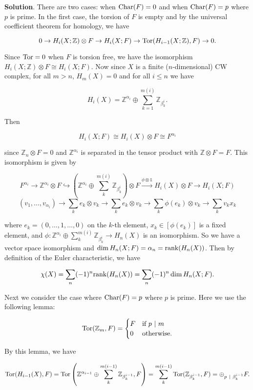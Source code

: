 \documentclass{article}
\newcommand{\Z}{\mathbb{Z}}
\newcommand{\identity}{\mathds{1}}
\newcommand{\Tor}{\textnormal{Tor}}
\newcommand{\Char}{\textnormal{Char}}
\begin{document}
\textbf{Solution}. There are two cases: when $\Char(F) = 0$ and when $\Char(F) = p$ where $p$ is prime. In the first case, the torsion of $F$ is empty and by the universal coefficient theorem for homology, we have

$$0\to H_{i}(X; \Z)\otimes F\to H_{i}(X; F)\to \Tor(H_{i-1}(X; \Z), F)\to 0.$$

Since $\Tor = 0$ when $F$ is torsion free, we have the isomorphism $H_{i}(X; \Z)\otimes F\cong H_{i}(X; F)$. Now since $X$ is a finite ($n$-dimensional) CW complex, for all $m > n$, $H_{m}(X) = 0$ and for all $i\leq n$ we have

$$H_{i}(X) = \Z^{\alpha_{i}}\oplus \sum_{k=1}^{m(i)} \Z_{\beta_{k}^{i}}.$$

Then

$$H_{i}(X; F)\cong H_{i}(X)\otimes F\cong F^{\alpha_{i}}$$

since $\Z_{n}\otimes F = 0$ and $\Z^{\alpha_{i}}$ is separated in the tensor product with $\Z\otimes F = F$. This isomorphism is given by

$$F^{\alpha_{i}}\to \Z^{\alpha_{i}}\otimes F\hookrightarrow \left(\Z^{\alpha_{i}}\oplus \sum_{k}^{m(i)} \Z_{\beta_{k}^{i}}\right)\otimes F\xrightarrow{\phi\otimes \identity} H_{i}(X)\otimes F\to H_{i}(X; F)$$
$$(v_{1},\ldots, v_{\alpha_{i}})\to \sum_{k}e_{k}\otimes v_{k}\to \sum_{k}e_{k}\otimes v_{k}\to \sum_{k}\phi(e_{k})\otimes v_{k}\to \sum_{k} v_{k}x_{k}$$

where $e_{k} = (0,\ldots, 1,\ldots, 0)$ on the $k$-th element, $x_{k}\in [\phi(e_{k})]$ is a fixed element, and $\phi: \Z^{\alpha_{i}}\oplus \sum_{k}^{m(i)}\Z_{\beta_{k}^{i}}\to H_{n}(X)$ is an isomorphism. So we have a vector space isomorphism and $\dim H_{n}(X; F) = \alpha_{n} = \textnormal{rank} (H_{n}(X))$. Then by definition of the Euler characteristic, we have

$$\chi(X) = \sum_{n}(-1)^{n}\textnormal{rank}(H_{n}(X)) = \sum_{n}(-1)^{n}\dim H_{n}(X; F).$$

Next we consider the case where $\Char(F) = p$ where $p$ is prime. Here we use the following lemma:

\[\Tor(\Z_{m}, F) = \begin{cases} F & \textnormal{if } p\ |\ m\\ 0 & \textnormal{otherwise}. \end{cases}\]

By this lemma, we have

$$\Tor(H_{i-1}(X), F) = \Tor\left(\Z^{\alpha_{i-1}}\oplus \sum_{k}^{m(i-1)}\Z_{\beta_{k}^{i-1}}, F\right) = \sum_{k}^{m(i-1)} \Tor(\Z_{\beta_{k}^{i-1}}, F) = \oplus_{p\ |\ \beta_{k}^{i-1}} F.$$
\end{document}
